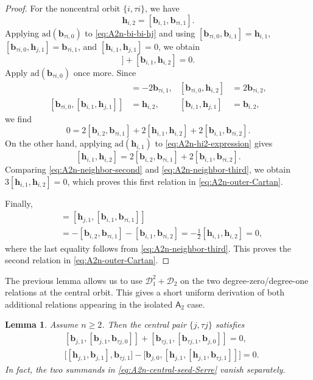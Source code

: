 \documentclass[11pt,reqno]{amsart}
\numberwithin{equation}{section}
\newtheorem{lem}[thm]{Lemma}
\theoremstyle{definition}
\theoremstyle{remark}
\newcommand{\cD}{\mathcal{D}}
\newcommand{\bb}{\mathbf{b}}
\newcommand{\bh}{\mathbf{h}}
\newcommand{\gge}{\geqslant}
\newcommand{\ad}{\mathrm{ad}}
\begin{document}
\begin{proof}
For the noncentral orbit $\{i,\tau i\}$, we have
\begin{equation}\label{eq:A2n-hi2-expression}
\bh_{i,2}=[\bb_{i,1},\bb_{\tau i,1}].
\end{equation}
Applying $\ad(\bb_{\tau i,0})$ to
\eqref{eq:A2n-bi-bi-hj} and using $[\bb_{\tau i,0},\bb_{i,1}]=\bh_{i,1}$, $
[\bb_{\tau i,0},\bh_{j,1}]=\bb_{\tau i,1}$, and $[\bh_{i,1},\bh_{j,1}]=0$,
we obtain
\begin{equation*}
[\bh_{i,1},[\bb_{i,1},\bh_{j,1}]]
+
[\bb_{i,1},\bh_{i,2}]
=0.
\end{equation*}
Apply $\ad(\bb_{\tau i,0})$ once more.  Since
\begin{align*}
[\bb_{\tau i,0},\bh_{i,1}]
&=-2\bb_{\tau i,1},
&
[\bb_{\tau i,0},\bh_{i,2}]
&=2\bb_{\tau i,2},
\\
[\bb_{\tau i,0},
[\bb_{i,1},\bh_{j,1}]]
&=\bh_{i,2},
&
[\bb_{i,1},\bh_{j,1}]
&=\bb_{i,2},
\end{align*}
we find
\begin{equation}\label{eq:A2n-neighbor-second}
0=
2[\bb_{i,2},\bb_{\tau i,1}]
+
2[\bh_{i,1},\bh_{i,2}]
+
2[\bb_{i,1},\bb_{\tau i,2}].
\end{equation}
On the other hand, applying $\ad(\bh_{i,1})$ to
\eqref{eq:A2n-hi2-expression} gives
\begin{equation}\label{eq:A2n-neighbor-third}
[\bh_{i,1},\bh_{i,2}]
=
2[\bb_{i,2},\bb_{\tau i,1}]
+
2[\bb_{i,1},\bb_{\tau i,2}].
\end{equation}
Comparing \eqref{eq:A2n-neighbor-second} and
\eqref{eq:A2n-neighbor-third}, we obtain $3[\bh_{i,1},\bh_{i,2}]=0$,
which proves this first relation in \eqref{eq:A2n-outer-Cartan}.

Finally,
\begin{align*}
[\bh_{j,1},\bh_{i,2}]
&=
[\bh_{j,1},
[\bb_{i,1},\bb_{\tau i,1}]]
\\
&=
-[\bb_{i,2},\bb_{\tau i,1}]
-
[\bb_{i,1},\bb_{\tau i,2}]
=
-\tfrac12[\bh_{i,1},\bh_{i,2}]
=0,
\end{align*}
where the last equality follows from
\eqref{eq:A2n-neighbor-third}.  This proves the second relation in 
\eqref{eq:A2n-outer-Cartan}.
\end{proof}


The previous lemma allows us to use $\cD_1^2+\cD_2$ on the two
degree-zero/degree-one relations at the central orbit.  This gives a
short uniform derivation of both additional relations appearing in
the isolated $\mathsf A_2$ case.

\begin{lem}\label{lem:A2n-central-seeds}
Assume $n\gge2$.  Then the central pair $\{j,\tau j\}$ satisfies
\begin{align}
&
[\bb_{j,1},[\bb_{j,1},\bb_{\tau j,0}]]
+
[\bb_{\tau j,1},[\bb_{\tau j,1},\bb_{j,0}]]
=0,
\label{eq:A2n-central-seed-Serre}
\\
&
\big[[\bh_{j,1},\bb_{j,1}],\bb_{\tau j,1}\big]
-
\big[\bb_{j,0},
[\bh_{j,1},[\bh_{j,1},\bb_{\tau j,1}]]
\big]
=0.
\label{eq:A2n-central-seed-Cartan}
\end{align}
In fact, the two summands in
\eqref{eq:A2n-central-seed-Serre} vanish separately.
\end{lem}
\end{document}
